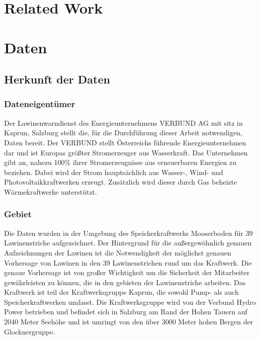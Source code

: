 \documentclass[12pt,a4paper]{article}
\title{\titlename}
\author{ \authorname\\ \scriptsize \authormail \\ \scriptsize \address }
\author{ \authorid\\ \scriptsize \address }
\date{\exposedate}
\begin{document}



\maketitle

\tableofcontents
\newpage


\section{Related Work}


\section{Daten}

\subsection{Herkunft der Daten}

\subsubsection{Dateneigentümer}
Der Lawinenwarndienst des Energieunternehmens VERBUND AG mit sitz in Kaprun, Salzburg stellt die, für die Durchführung dieser Arbeit notwendigen, Daten bereit. Der VERBUND stellt Österreichs führende Energieunternehmen dar und ist Europas größter Stromerzeuger aus Wasserkraft. Das Unternehmen gibt an, nahezu 100\% ihrer Stromerzeugnisse aus erneuerbaren Energien zu beziehen. Dabei wird der Strom hauptsächlich aus Wasser-, Wind- und Photovoltaikkraftwerken erzeugt. Zusätzlich wird dieser durch Gas beheizte Wärmekraftwerke unterstützt\autocites{Verbund:2022}.

\subsubsection{Gebiet}
Die Daten wurden in der Umgebung des Speicherkraftwerks Mooserboden für 39 Lawinenstriche aufgezeichnet. Der Hintergrund für die außergewöhnlich genauen Aufzeichnungen der Lawinen ist die Notwendigkeit der möglichst genauen Vorhersage von Lawinen in den 39 Lawinenstrichen rund um das Kraftwerk. Die genaue Vorhersage ist von großer Wichtigkeit um die Sicherheit der Mitarbeiter gewährleisten zu können, die in den gebieten der Lawinenstriche arbeiten. Das Kraftwerk ist teil der Kraftwerksgruppe Kaprun, die sowohl Pump- als auch Speicherkraftwerken umfasst. Die Kraftwerksgruppe wird von der Verbund Hydro Power betrieben und befindet sich in Salzburg am Rand der Hohen Tauern auf 2040 Meter Seehöhe und ist umringt von den über 3000 Meter hohen Bergen der Glocknergruppe.\autocites{VerbundKaprun:2022}
 
\end{document}
